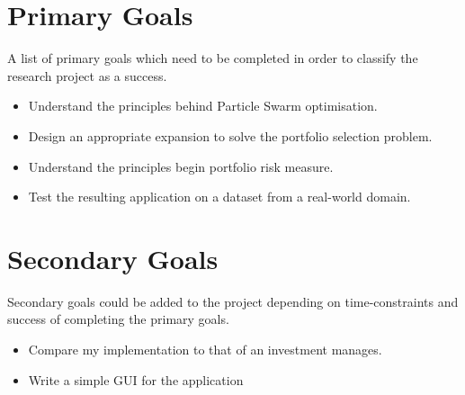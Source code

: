   \section{Primary Goals} %
  \label{sec:primary_goals}
  A list of primary goals which need to be completed in order to classify the research project as a success.
  \begin{itemize}
    \item Understand the principles behind Particle Swarm optimisation.
    \item Design an appropriate expansion to solve the portfolio selection problem.
    \item Understand the principles begin portfolio risk measure.
    \item Test the resulting application on a dataset from a real-world domain.
  \end{itemize}

  \section{Secondary Goals} %
  \label{sec:secondary_goals}
  Secondary goals could be added to the project depending on time-constraints and success of completing the primary goals.
  \begin{itemize}
    \item Compare my implementation to that of an investment manages. 
    \item Write a simple GUI for the application
  \end{itemize}
